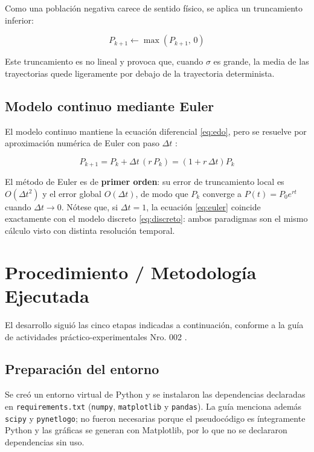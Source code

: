 \documentclass[11pt,a4paper]{article}
\begin{document}
Como una poblaci\'on negativa carece de sentido f\'isico, se aplica un truncamiento
inferior:

\begin{equation}
P_{k+1} \leftarrow \max\!\left(P_{k+1},\,0\right)
\label{eq:truncamiento}
\end{equation}

Este truncamiento es no lineal y provoca que, cuando $\sigma$ es grande, la media de las
trayectorias quede ligeramente por debajo de la trayectoria determinista.

\subsection{Modelo continuo mediante Euler}

El modelo continuo mantiene la ecuaci\'on diferencial \eqref{eq:edo}, pero se resuelve por
aproximaci\'on num\'erica de Euler con paso $\Delta t$ \cite{burden2011}:

\begin{equation}
P_{k+1} = P_k + \Delta t\,\left(r\,P_k\right) = \left(1 + r\,\Delta t\right)P_k
\label{eq:euler}
\end{equation}

El m\'etodo de Euler es de \textbf{primer orden}: su error de truncamiento local es
$O(\Delta t^{2})$ y el error global $O(\Delta t)$, de modo que $P_k$ converge a
$P(t) = P_0e^{rt}$ cuando $\Delta t \to 0$. N\'otese que, si $\Delta t = 1$, la ecuaci\'on
\eqref{eq:euler} coincide exactamente con el modelo discreto \eqref{eq:discreto}: ambos
paradigmas son el mismo c\'alculo visto con distinta resoluci\'on temporal.

\section{Procedimiento / Metodolog\'ia Ejecutada}

El desarrollo sigui\'o las cinco etapas indicadas a continuaci\'on, conforme a la gu\'ia de
actividades pr\'actico-experimentales Nro. 002 \cite{guaman2026ape2}.

\subsection{Preparaci\'on del entorno}

Se cre\'o un entorno virtual de Python y se instalaron las dependencias declaradas en
\texttt{requirements.txt} (\texttt{numpy}, \texttt{matplotlib} y \texttt{pandas}). La gu\'ia
menciona adem\'as \texttt{scipy} y \texttt{pynetlogo}; no fueron necesarias porque el
pseudocódigo es \'integramente Python y las gr\'aficas se generan con Matplotlib, por lo
que no se declararon dependencias sin uso.
\end{document}
